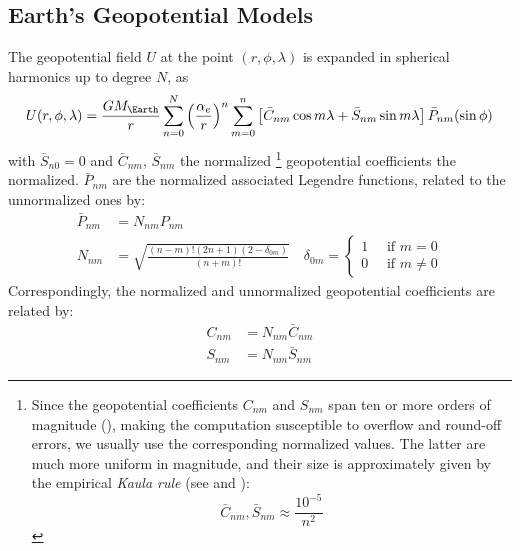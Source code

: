 \subsection{Earth's Geopotential Models}
The geopotential field $U$ at the point $(r, \phi , \lambda )$ is expanded in 
spherical harmonics up to degree $N$, as
\begin{equation}
  \label{eq:iers201061}
  U(r, \phi , \lambda ) = \frac{G M_{\Earth}}{r} \sum_{n=0}^N 
    {\left(\frac{\alpha _e}{r}\right)}^n 
     \sum_{m=0}^n \left[ \bar{C}_{nm} \cos {m \lambda} + \bar{S}_{nm} \sin{m \lambda} \right] 
     \bar{P}_{nm}( \sin \phi )
\end{equation}
with $\bar{S}_{n0} = 0$ and $\bar{C}_{nm}$, $\bar{S}_{nm}$ the normalized
\footnote{Since the geopotential coefficients $C_{nm}$ and $S_{nm}$ span ten or 
more orders of magnitude (\cite{Montenbruck2000}), making the computation 
susceptible to overflow and round-off errors, we usually use the corresponding 
normalized values. The latter are much more uniform in magnitude, and their 
size is approximately given by the empirical \emph{Kaula rule} (see 
\cite{Montenbruck2000} and \cite{Kaula2000}):
\begin{equation} \bar{C}_{nm} , \bar{S}_{nm} \approx \frac{10^{-5}}{n^2} \end{equation}}
geopotential coefficients the normalized. $\bar{P}_{nm}$ are the normalized 
associated Legendre functions, related to the unnormalized ones by:
\begin{subequations}
  \begin{align}
    \bar{P}_{nm} &= N_{nm} P_{nm} \label{eq:iers201062a} \\
    N_{nm} &= \sqrt{\frac{(n-m)!(2n+1)(2-\delta _{0m})}{(n+m)!}} 
      \quad \delta _{0m} = 
        \begin{cases}
          1 \quad \text{ if } m = 0 \\
          0 \quad \text{ if } m \neq 0
        \end{cases}
        \label{eq:iers201062b}
  \end{align}
\end{subequations}
Correspondingly, the normalized and unnormalized geopotential coefficients are 
related by:
\begin{subequations}
  \begin{align}
    C_{nm} &= N_{nm} \bar{C}_{nm} \\
    S_{nm} &= N_{nm} \bar{S}_{nm}
  \end{align}
\end{subequations}


